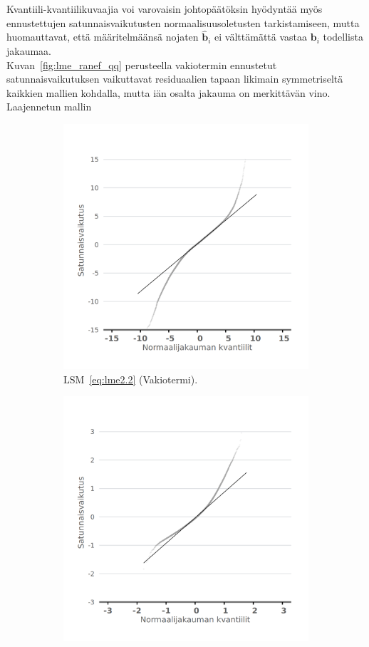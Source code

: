 \documentclass[finnish]{docopts}
\begin{document}
Kvantiili-kvantiilikuvaajia voi varovaisin johtopäätöksin hyödyntää myös ennustettujen satunnaisvaikutusten normaalisuusoletusten tarkistamiseen, mutta \cite{burzykowski13} huomauttavat, että määritelmäänsä nojaten $\hat{\bm{b}}_i$ ei välttämättä vastaa $\bm{b}_i$ todellista jakaumaa.\\

Kuvan~\ref{fig:lme_ranef_qq} perusteella vakiotermin ennustetut satunnaisvaikutuksen vaikuttavat residuaalien tapaan likimain symmetriseltä kaikkien mallien kohdalla, mutta iän osalta jakauma on merkittävän vino. Laajennetun mallin \\

\begin{figure}[H]
\centering
\begin{subfigure}[b]{0.4\textwidth}
\centering
  \includegraphics[width=.8\linewidth]{kuvaajat/lme3_qq_ranef_int.png}
  \caption{$\text{LSM}$~\ref{eq:lme2.2} (Vakiotermi).}
  \label{fig:lme_krit_int_qq}
\end{subfigure}%
\begin{subfigure}[b]{0.4\textwidth}
\centering
  \includegraphics[width=.8\linewidth]{kuvaajat/lme3_qq_ranef_ika.png}

\end{subfigure}
\end{figure}
\end{document}
